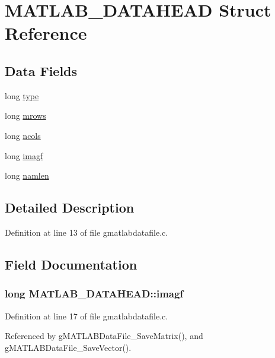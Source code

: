 \hypertarget{structMATLAB__DATAHEAD}{
\section{MATLAB\_\-DATAHEAD Struct Reference}
\label{structMATLAB__DATAHEAD}
}
\subsection*{Data Fields}
\begin{DoxyCompactItemize}
\item 
long \hyperlink{structMATLAB__DATAHEAD_ad3587e58da5ca6cbe3cd98d5e2f46202}{type}
\item 
long \hyperlink{structMATLAB__DATAHEAD_abf1ef02c93522915bd7fdf9f72df44b7}{mrows}
\item 
long \hyperlink{structMATLAB__DATAHEAD_ae87d8eca5290fa03d01c79061498626f}{ncols}
\item 
long \hyperlink{structMATLAB__DATAHEAD_a7831e4f01682863fce4ba98071a7db08}{imagf}
\item 
long \hyperlink{structMATLAB__DATAHEAD_ad6e65844dcff1eb1cf7bf8752ba9a91c}{namlen}
\end{DoxyCompactItemize}


\subsection{Detailed Description}


Definition at line 13 of file gmatlabdatafile.c.



\subsection{Field Documentation}
\hypertarget{structMATLAB__DATAHEAD_a7831e4f01682863fce4ba98071a7db08}{
\subsubsection[{imagf}]{\setlength{\rightskip}{0pt plus 5cm}long {\bf MATLAB\_\-DATAHEAD::imagf}}}
\label{structMATLAB__DATAHEAD_a7831e4f01682863fce4ba98071a7db08}


Definition at line 17 of file gmatlabdatafile.c.



Referenced by gMATLABDataFile\_\-SaveMatrix(), and gMATLABDataFile\_\-SaveVector().

